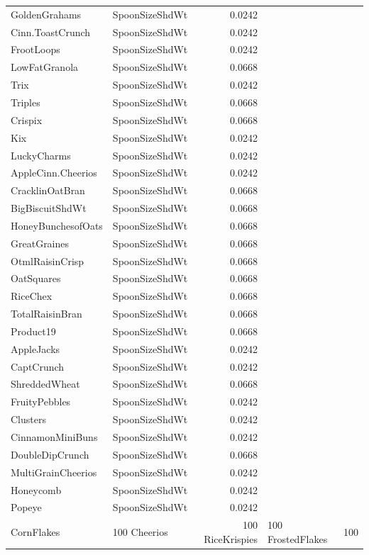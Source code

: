 \begin{longtable}{llr}
GoldenGrahams & SpoonSizeShdWt & 0.0242 \\
Cinn.ToastCrunch & SpoonSizeShdWt & 0.0242 \\
FrootLoops & SpoonSizeShdWt & 0.0242 \\
LowFatGranola & SpoonSizeShdWt & 0.0668 \\
Trix & SpoonSizeShdWt & 0.0242 \\
Triples & SpoonSizeShdWt & 0.0668 \\
Crispix & SpoonSizeShdWt & 0.0668 \\
Kix & SpoonSizeShdWt & 0.0242 \\
LuckyCharms & SpoonSizeShdWt & 0.0242 \\
AppleCinn.Cheerios & SpoonSizeShdWt & 0.0242 \\
CracklinOatBran & SpoonSizeShdWt & 0.0668 \\
BigBiscuitShdWt & SpoonSizeShdWt & 0.0668 \\
HoneyBunchesofOats & SpoonSizeShdWt & 0.0668 \\
GreatGraines & SpoonSizeShdWt & 0.0668 \\
OtmlRaisinCrisp & SpoonSizeShdWt & 0.0668 \\
OatSquares & SpoonSizeShdWt & 0.0668 \\
RiceChex & SpoonSizeShdWt & 0.0668 \\
TotalRaisinBran & SpoonSizeShdWt & 0.0668 \\
Product19 & SpoonSizeShdWt & 0.0668 \\
AppleJacks & SpoonSizeShdWt & 0.0242 \\
CaptCrunch & SpoonSizeShdWt & 0.0242 \\
ShreddedWheat & SpoonSizeShdWt & 0.0668 \\
FruityPebbles & SpoonSizeShdWt & 0.0242 \\
Clusters & SpoonSizeShdWt & 0.0242 \\
CinnamonMiniBuns & SpoonSizeShdWt & 0.0242 \\
DoubleDipCrunch & SpoonSizeShdWt & 0.0668 \\
MultiGrainCheerios & SpoonSizeShdWt & 0.0242 \\
Honeycomb & SpoonSizeShdWt & 0.0242 \\
Popeye & SpoonSizeShdWt & 0.0242 \\
CornFlakes & 100%
Cheerios & 100%
RiceKrispies & 100%
FrostedFlakes & 100%

\end{longtable}
